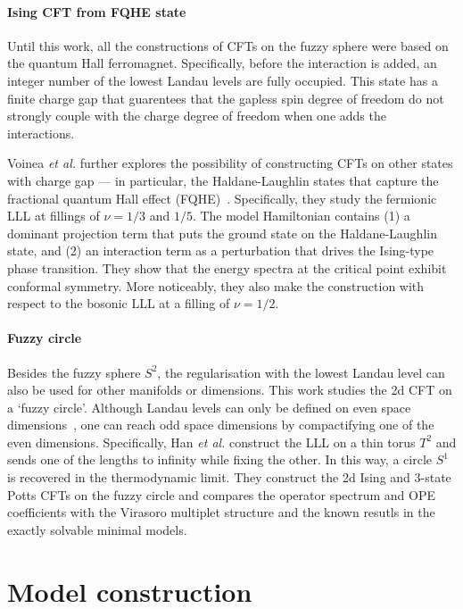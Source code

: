 \documentclass{timesjhep}
\begin{document}
\paragraph{Ising CFT from FQHE state~\cite{Voinea2024}}

Until this work, all the constructions of CFTs on the fuzzy sphere were based on the quantum Hall ferromagnet. Specifically, before the interaction is added, an integer number of the lowest Landau levels are fully occupied. This state has a finite charge gap that guarentees that the gapless spin degree of freedom do not strongly couple with the charge degree of freedom when one adds the interactions. 

Voinea \textit{et al.} further explores the possibility of constructing CFTs on other states with charge gap --- in particular, the Haldane-Laughlin states that capture the fractional quantum Hall effect (FQHE)~\cite{Haldane1983LLL,Laughlin1983FQHE}. Specifically, they study the fermionic LLL at fillings of $\nu=1/3$ and $1/5$. The model Hamiltonian contains (1) a dominant projection term that puts the ground state on the Haldane-Laughlin state, and (2) an interaction term as a perturbation that drives the Ising-type phase transition. They show that the energy spectra at the critical point exhibit conformal symmetry. More noticeably, they also make the construction with respect to the bosonic LLL at a filling of $\nu=1/2$. 

\paragraph{Fuzzy circle~\cite{Han2025}}

Besides the fuzzy sphere $S^2$, the regularisation with the lowest Landau level can also be used for other manifolds or dimensions. This work studies the 2d CFT on a `fuzzy circle'. Although Landau levels can only be defined on even space dimensions~\cite{Hasebe2020Landau}, one can reach odd space dimensions by compactifying one of the even dimensions. Specifically, Han \textit{et al.} construct the LLL on a thin torus $T^2$ and sends one of the lengths to infinity while fixing the other. In this way, a circle $S^1$ is recovered in the thermodynamic limit. They construct the 2d Ising and 3-state Potts CFTs on the fuzzy circle and compares the operator spectrum and OPE coefficients with the Virasoro multiplet structure and the known resutls in the exactly solvable minimal models.

\section{Model construction}
\label{sec:construct}
\end{document}
